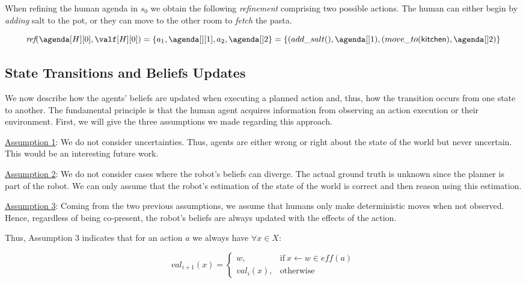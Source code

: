 When refining the human agenda in $s_0$ we obtain the following \textit{refinement} comprising two possible actions. The human can either begin by \textit{adding} salt to the pot, or they can move to the other room to \textit{fetch} the pasta. 

{\small
\begin{equation*}
    \textit{ref}(\agenda[H][0], \valf[H][0]) = \{ a_1,\agenda[][1], a_2,\agenda[]2 \}= \{ (add\_salt(),\agenda[]1), (move\_to(\textsf{kitchen}),\agenda[]2) \}
\end{equation*}
}

    \subsection{State Transitions and Beliefs Updates}

We now describe how the agents' beliefs are updated when executing a planned action and, thus, how the transition occurs from one state to another. The fundamental principle is that the human agent acquires information from observing an action execution or their environment. First, we will give the three assumptions we made regarding this approach.

\underline{Assumption 1}: We do not consider uncertainties. Thus, agents are either wrong or right about the state of the world but never uncertain. This would be an interesting future work. 

\underline{Assumption 2}: We do not consider cases where the robot's beliefs can diverge. The actual ground truth is unknown since the planner is part of the robot. We can only assume that the robot's estimation of the state of the world is correct and then reason using this estimation.

\underline{Assumption 3}: Coming from the two previous assumptions, we assume that humans only make deterministic moves when not observed. Hence, regardless of being co-present, the robot's beliefs are always updated with the effects of the action.


Thus, Assumption 3 indicates that for an action $a$ we always have $\forall x \in X$:

\begin{equation} \label{eq:apply_action_r}
    val_{i+1}(x) = \left\{ 
    \begin{array}{ll}
        w, & \mbox{if} ~ x \leftarrow w \in \textit{eff}(a)   \\ 
        val_i(x), & \mbox{otherwise}
    \end{array}\right.
\end{equation}


